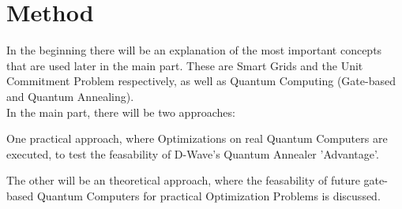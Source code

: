 \section{Method}

In the beginning there will be an explanation of the most important concepts
that are used later in the main part.
These are Smart Grids and the Unit Commitment Problem respectively,
as well as Quantum Computing (Gate-based and Quantum Annealing).\\

In the main part, there will be two approaches:

One practical approach, where Optimizations on real Quantum Computers are executed,
to test the feasability of D-Wave's Quantum Annealer 'Advantage'.

The other will be an theoretical approach, where the feasability of future gate-based Quantum Computers
for practical Optimization Problems is discussed.
